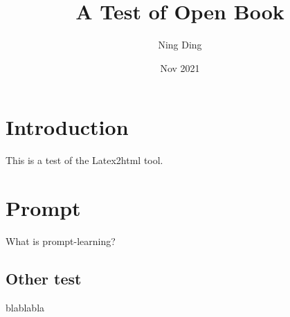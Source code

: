 \documentclass{article}
\title{A Test of Open Book}
\author{Ning Ding}
\date{Nov 2021}
\begin{document}
\maketitle

\section{Introduction}

This is a test of the Latex2html tool.

\section{Prompt}

What is prompt-learning?


\subsection{Other test}
blablabla
\end{document}
